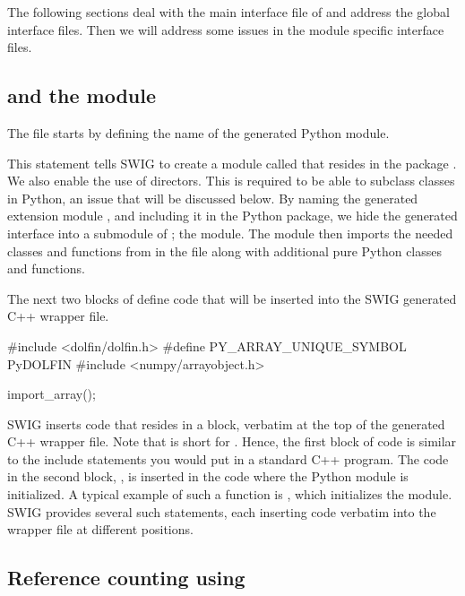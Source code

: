 The following sections deal with the main interface file of 
and address the global interface files. Then we will address some issues
in the module specific interface files.

\subsection{ and the  module}
The file  starts by defining the name of the generated
Python module.
\begin{swigcode}
\end{swigcode}
This statement tells SWIG to create a module called  that
resides in the package \dolfin{}. We also enable the use of
directors.  This is required to be able to subclass \dolfin classes
in Python, an issue that will be discussed below.  By naming the generated
extension module , and including it in the \dolfin{} Python
package, we hide the generated interface into a submodule of \dolfin{}; the
 module.  The \dolfin{} module then imports the needed
classes and functions from  in the 
file along with additional pure Python classes and functions.

The next two blocks of  define code that will be inserted
into the SWIG generated C++ wrapper file.
\begin{swigcode}
#include <dolfin/dolfin.h>
#define PY_ARRAY_UNIQUE_SYMBOL PyDOLFIN
#include <numpy/arrayobject.h>

import_array();
\end{swigcode}
SWIG inserts code that resides in a \emp{\%\{$\ldots$\%\}} block,
verbatim at the top of the generated C++ wrapper file. Note that
\emp{\%\{$\ldots$\%\}} is short for . Hence,
the first block of code is similar to the include statements you
would put in a standard C++ program. The code in the second block,
, is inserted in the code where the
Python module is initialized. A typical example of such a function is
, which initializes the \numpy module. SWIG provides
several such statements, each inserting code verbatim into the wrapper
file at different positions.

\subsection{Reference counting using }

